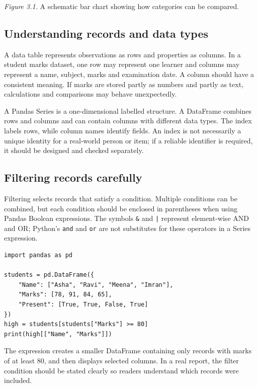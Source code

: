 \documentclass[11pt,openany,oneside]{book}
\begin{document}
\begin{center}
\end{center}
\textit{Figure 3.1.} A schematic bar chart showing how categories can be compared.

\subsection{Understanding records and data types}
A data table represents observations as rows and properties as columns. In a student marks dataset, one row may represent one learner and columns may represent a name, subject, marks and examination date. A column should have a consistent meaning. If marks are stored partly as numbers and partly as text, calculations and comparisons may behave unexpectedly.

A Pandas Series is a one-dimensional labelled structure. A DataFrame combines rows and columns and can contain columns with different data types. The index labels rows, while column names identify fields. An index is not necessarily a unique identity for a real-world person or item; if a reliable identifier is required, it should be designed and checked separately.

\subsection{Filtering records carefully}
Filtering selects records that satisfy a condition. Multiple conditions can be combined, but each condition should be enclosed in parentheses when using Pandas Boolean expressions. The symbols \texttt{\&} and \texttt{|} represent element-wise AND and OR; Python's \texttt{and} and \texttt{or} are not substitutes for these operators in a Series expression.

\begin{lstlisting}[style=pythonstyle]
import pandas as pd

students = pd.DataFrame({
    "Name": ["Asha", "Ravi", "Meena", "Imran"],
    "Marks": [78, 91, 84, 65],
    "Present": [True, True, False, True]
})
high = students[students["Marks"] >= 80]
print(high[["Name", "Marks"]])
\end{lstlisting}
The expression creates a smaller DataFrame containing only records with marks of at least 80, and then displays selected columns. In a real report, the filter condition should be stated clearly so readers understand which records were included.
\end{document}
